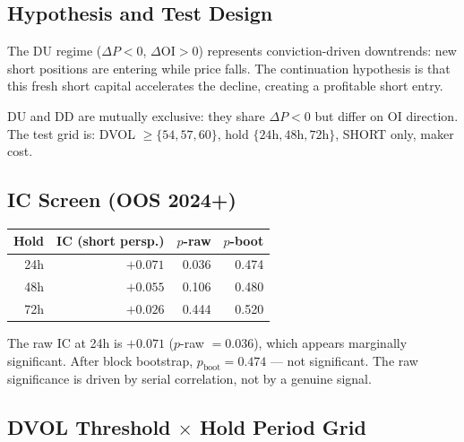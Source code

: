 \documentclass[12pt, a4paper]{article}
\theoremstyle{plain}
\theoremstyle{definition}
\newcommand{\OI}{\mathrm{OI}}
\begin{document}
\subsection{Hypothesis and Test Design}

The DU regime ($\Delta P < 0$, $\Delta\OI > 0$) represents conviction-driven
downtrends: new short positions are entering while price falls.  The
continuation hypothesis is that this fresh short capital accelerates the
decline, creating a profitable short entry.

DU and DD are mutually exclusive: they share $\Delta P < 0$ but differ
on OI direction.  The test grid is: DVOL $\geq \{54, 57, 60\}$, hold
$\{24\mathrm{h}, 48\mathrm{h}, 72\mathrm{h}\}$, SHORT only, maker cost.

\subsection{IC Screen (OOS 2024+)}

\begin{center}
\begin{tabular}{rrrr}
\toprule
Hold & IC (short persp.) & $p$-raw & $p$-boot \\
\midrule
24h & $+0.071$ & 0.036 & 0.474 \\
48h & $+0.055$ & 0.106 & 0.480 \\
72h & $+0.026$ & 0.444 & 0.520 \\
\bottomrule
\end{tabular}
\end{center}

The raw IC at 24h is $+0.071$ ($p$-raw $= 0.036$), which appears marginally
significant.  After block bootstrap, $p_{\mathrm{boot}} = 0.474$ --- not
significant.  The raw significance is driven by serial correlation, not
by a genuine signal.

\subsection{DVOL Threshold $\times$ Hold Period Grid}
\end{document}
